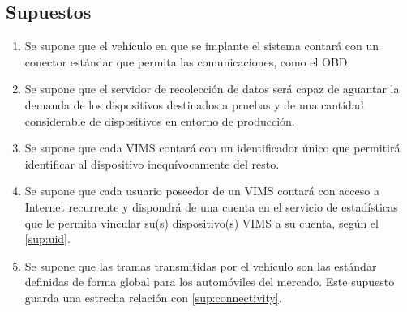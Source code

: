 \subsection*{Supuestos}
\begin{enumerate}[label=\textbf{\texttt{SUP-\arabic*}}]
  \item\label{sup:connectivity} Se supone que el vehículo en que se implante el sistema contará con un
        conector estándar que permita las comunicaciones, como el \ac{OBD}.
  \item\label{sup:server} Se supone que el servidor de recolección de datos será
        capaz de aguantar la demanda de los dispositivos destinados a pruebas y de
        una cantidad considerable de dispositivos en entorno de producción.
  \item\label{sup:uid} Se supone que cada \ac{VIMS} contará con un identificador
        único que permitirá identificar al dispositivo inequívocamente del resto.
  \item\label{sup:users} Se supone que cada usuario poseedor de un \ac{VIMS} contará
        con acceso a Internet recurrente y dispondrá de una cuenta en el servicio de
        estadísticas que le permita vincular su(s) dispositivo(s) \ac{VIMS} a su
        cuenta, según el \ref{sup:uid}.
  \item\label{sup:pids} Se supone que las tramas transmitidas por el vehículo
        son las estándar definidas de forma global para los automóviles del mercado.
        Este supuesto guarda una estrecha relación con \ref{sup:connectivity}.
\end{enumerate}